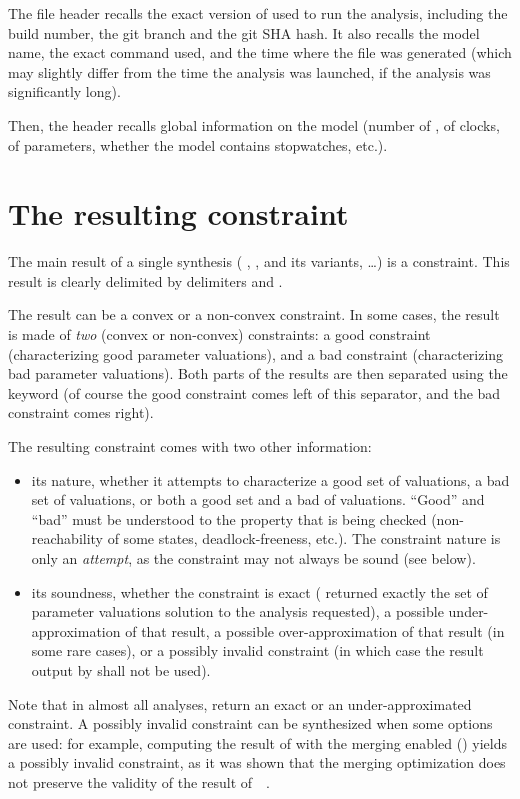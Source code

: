 The file header recalls the exact version of \imitator{} used to run the analysis, including the build number, the git branch and the git SHA hash.
It also recalls the model name, the exact command used, and the time where the file was generated (which may slightly differ from the time the analysis was launched, if the analysis was significantly long).

Then, the header recalls global information on the model (number of \IPTA{}, of clocks, of parameters, whether the model contains stopwatches, etc.).


\section{The resulting constraint}

The main result of a single synthesis (\ie{} \EFsynth{}, \PDFC{}, \IM{} and its variants, \PRP{}…) is a constraint.
This result is clearly delimited by delimiters  and .

The result can be a convex or a non-convex constraint.
In some cases, the result is made of \emph{two} (convex or non-convex) constraints: a good constraint (characterizing good parameter valuations), and a bad constraint (characterizing bad parameter valuations).
Both parts of the results are then separated using the keyword  (of course the good constraint comes left of this separator, and the bad constraint comes right).

The resulting constraint comes with two other information:
\begin{itemize}
	\item its nature, \ie{} whether it attempts to characterize a good set of valuations, a bad set of valuations, or both a good set and a bad of valuations.
		``Good'' and ``bad'' must be understood to the property that is being checked (non-reachability of some states, deadlock-freeness, etc.).
		The constraint nature is only an \emph{attempt}, as the constraint may not always be sound (see below).
	\item its soundness, \ie{} whether the constraint is exact (\imitator{} returned exactly the set of parameter valuations solution to the analysis requested), a possible under-approximation of that result, a possible over-approximation of that result (in some rare cases), or a possibly invalid constraint (in which case the result output by \imitator{} shall not be used).
\end{itemize}
Note that in almost all analyses, \imitator{} return an exact or an under-approximated constraint.
A possibly invalid constraint can be synthesized when some options are used: for example, computing the result of \IM{} with the merging enabled () yields a possibly invalid constraint, as it was shown that the merging optimization does not preserve the validity of the result of~\IM{}~\cite{AFS13atva}.

